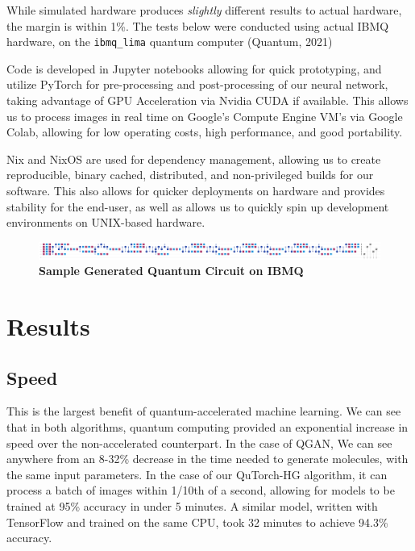 \documentclass{scrartcl}
\makeatletter
\newcommand{\citeprocitem}[2]{\hyper@linkstart{cite}{citeproc_bib_item_#1}#2\hyper@linkend}
\makeatother
\begin{document}
While simulated hardware produces \emph{slightly} different results to actual hardware, the margin is within 1\%. The tests below were conducted using actual IBMQ hardware, on the \verb~ibmq_lima~ quantum computer (\citeprocitem{14}{Quantum, 2021})

Code is developed in Jupyter notebooks allowing for quick prototyping, and utilize PyTorch for pre-processing and post-processing of our neural network, taking advantage of GPU Acceleration via Nvidia CUDA if available. This allows us to process images in real time on Google's Compute Engine VM's via Google Colab, allowing for low operating costs, high performance, and good portability.

Nix and NixOS are used for dependency management, allowing us to create reproducible, binary cached, distributed, and non-privileged builds for our software. This also allows for quicker deployments on hardware and provides stability for the end-user, as well as allows us to quickly spin up development environments on UNIX-based hardware.

\begin{figure}[htbp]
\centering
\includegraphics[width=.9\linewidth]{./assets/circuit.png}
\caption{\textbf{Sample Generated Quantum Circuit on IBMQ}}
\end{figure}

\section{Results}
\label{sec:org83bd39f}

\subsection{Speed}
\label{sec:orgd088ab6}

This is the largest benefit of quantum-accelerated machine learning.  We can see that in both algorithms, quantum computing provided an exponential increase in speed over the non-accelerated counterpart. In the case of QGAN, We can see anywhere from an 8-32\% decrease in the time needed to generate molecules, with the same input parameters. In the case of our QuTorch-HG algorithm, it can process a batch of images within 1/10th of a second, allowing for models to be trained at 95\% accuracy in under 5 minutes. A similar model, written with TensorFlow and trained on the same CPU, took 32 minutes to achieve 94.3\% accuracy.
\end{document}
